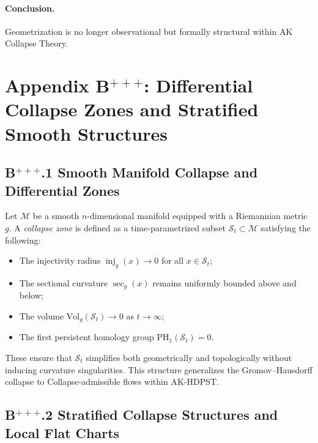 \documentclass[11pt]{article}
\begin{document}
\paragraph{Conclusion.} Geometrization is no longer observational but formally structural within AK Collapse Theory.





\section*{Appendix B$^{+++}$: Differential Collapse Zones and Stratified Smooth Structures}

\subsection*{B$^{+++}$.1 Smooth Manifold Collapse and Differential Zones}

Let \( \mathcal{M} \) be a smooth \( n \)-dimensional manifold equipped with a Riemannian metric \( g \). A \emph{collapse zone} is defined as a time-parametrized subset \( \mathcal{S}_t \subset \mathcal{M} \) satisfying the following:

\begin{itemize}
  \item The injectivity radius \( \operatorname{inj}_g(x) \to 0 \) for all \( x \in \mathcal{S}_t \);
  \item The sectional curvature \( \sec_g(x) \) remains uniformly bounded above and below;
  \item The volume \( \mathrm{Vol}_g(\mathcal{S}_t) \to 0 \) as \( t \to \infty \);
  \item The first persistent homology group \( \mathrm{PH}_1(\mathcal{S}_t) = 0 \).
\end{itemize}

These ensure that \( \mathcal{S}_t \) simplifies both geometrically and topologically without inducing curvature singularities. This structure generalizes the Gromov--Hausdorff collapse to Collapse-admissible flows within AK-HDPST.

\subsection*{B$^{+++}$.2 Stratified Collapse Structures and Local Flat Charts}
\end{document}
